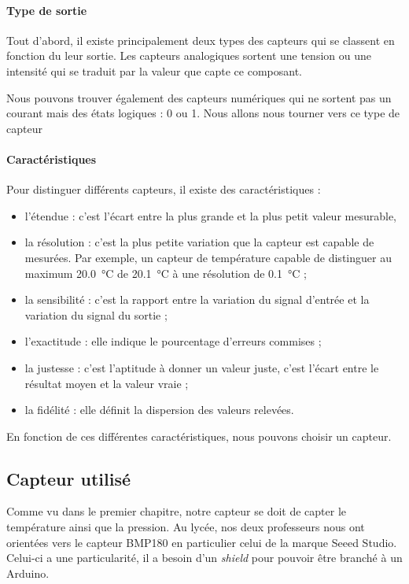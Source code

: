 \paragraph{Type de sortie} Tout d'abord, il existe principalement deux types des capteurs qui se classent en fonction du leur sortie. Les capteurs analogiques sortent une tension ou une intensité qui se traduit par la valeur que capte ce composant.

Nous pouvons trouver également des capteurs numériques qui ne sortent pas un courant mais des états logiques : 0 ou 1. Nous allons nous tourner vers ce type de capteur

\paragraph{Caractéristiques} Pour distinguer différents capteurs, il existe des caractéristiques :
\begin{itemize}
	\item l'étendue : c'est l'écart entre la plus grande et la plus petit valeur mesurable,
	\item la résolution : c'est la plus petite variation que la capteur est capable de mesurées. Par exemple, un capteur de température capable de distinguer au maximum \SI{20,0}{\celsius} de \SI{20,1}{\celsius} à une résolution de \SI{0,1}{\celsius} ;
	\item la sensibilité : c'est la rapport entre la variation du signal d'entrée et la variation du signal du sortie ;
	\item l'exactitude : elle indique le pourcentage d'erreurs commises ;
	\item la justesse : c'est l'aptitude à donner un valeur juste, c'est l'écart entre le résultat moyen et la valeur vraie ;
	\item la fidélité : elle définit la dispersion des valeurs relevées.
\end{itemize}

En fonction de ces différentes caractéristiques, nous pouvons choisir un capteur.

\subsection{Capteur utilisé}

Comme vu dans le premier chapitre, notre capteur se doit de capter le température ainsi que la pression. Au lycée, nos deux professeurs nous ont orientées vers le capteur BMP180 en particulier celui de la marque Seeed Studio. Celui-ci a une particularité, il a besoin d'un \emph{shield} pour pouvoir être branché à un Arduino.

